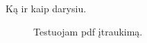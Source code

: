 Ką ir kaip darysiu.

\begin{figure}
  \centering
{}
\caption{Testuojam pdf įtraukimą.}
\end{figure}

